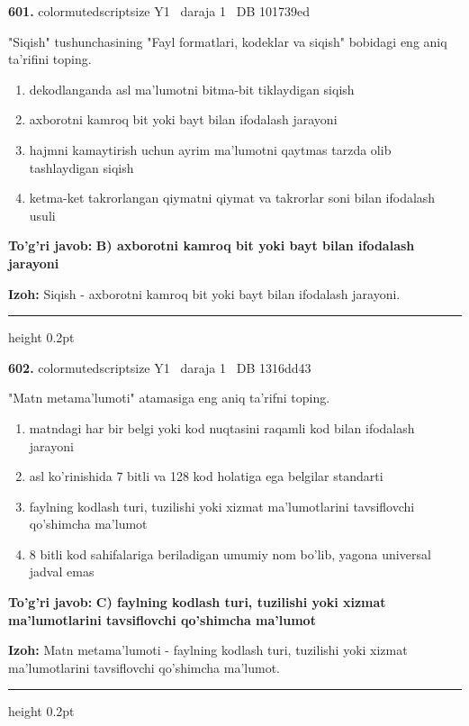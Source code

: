 \documentclass[10pt,a4paper,oneside]{article}
\begin{document}
\noindent\textbf{\color{ink}601.}  {color{muted}scriptsize Y1 \textbullet\ daraja 1 \textbullet\ DB 101739ed}
\par
"Siqish" tushunchasining "Fayl formatlari, kodeklar va siqish" bobidagi eng aniq ta'rifini toping.
\begin{enumerate}[label=\Alph*),leftmargin=9mm]
\item dekodlanganda asl ma'lumotni bitma-bit tiklaydigan siqish
\item axborotni kamroq bit yoki bayt bilan ifodalash jarayoni
\item hajmni kamaytirish uchun ayrim ma'lumotni qaytmas tarzda olib tashlaydigan siqish
\item ketma-ket takrorlangan qiymatni qiymat va takrorlar soni bilan ifodalash usuli
\end{enumerate}
\begin{tcolorbox}[enhanced,breakable,colback=teal!4,colframe=teal!50!black,boxrule=0.5pt,arc=1.1mm,left=3mm,right=3mm,top=1.7mm,bottom=1.7mm,before skip=2mm,after skip=2mm]
\textbf{\color{teal}To'g'ri javob:} \textbf{B) axborotni kamroq bit yoki bayt bilan ifodalash jarayoni}
\par\smallskip
\textbf{Izoh:} Siqish - axborotni kamroq bit yoki bayt bilan ifodalash jarayoni.
\end{tcolorbox}
\vspace{2mm}\hrule height 0.2pt \vspace{3mm}

\noindent\textbf{\color{ink}602.}  {color{muted}scriptsize Y1 \textbullet\ daraja 1 \textbullet\ DB 1316dd43}
\par
"Matn metama'lumoti" atamasiga eng aniq ta'rifni toping.
\begin{enumerate}[label=\Alph*),leftmargin=9mm]
\item matndagi har bir belgi yoki kod nuqtasini raqamli kod bilan ifodalash jarayoni
\item asl ko'rinishida 7 bitli va 128 kod holatiga ega belgilar standarti
\item faylning kodlash turi, tuzilishi yoki xizmat ma'lumotlarini tavsiflovchi qo'shimcha ma'lumot
\item 8 bitli kod sahifalariga beriladigan umumiy nom bo'lib, yagona universal jadval emas
\end{enumerate}
\begin{tcolorbox}[enhanced,breakable,colback=teal!4,colframe=teal!50!black,boxrule=0.5pt,arc=1.1mm,left=3mm,right=3mm,top=1.7mm,bottom=1.7mm,before skip=2mm,after skip=2mm]
\textbf{\color{teal}To'g'ri javob:} \textbf{C) faylning kodlash turi, tuzilishi yoki xizmat ma'lumotlarini tavsiflovchi qo'shimcha ma'lumot}
\par\smallskip
\textbf{Izoh:} Matn metama'lumoti - faylning kodlash turi, tuzilishi yoki xizmat ma'lumotlarini tavsiflovchi qo'shimcha ma'lumot.
\end{tcolorbox}
\vspace{2mm}\hrule height 0.2pt \vspace{3mm}
\end{document}
